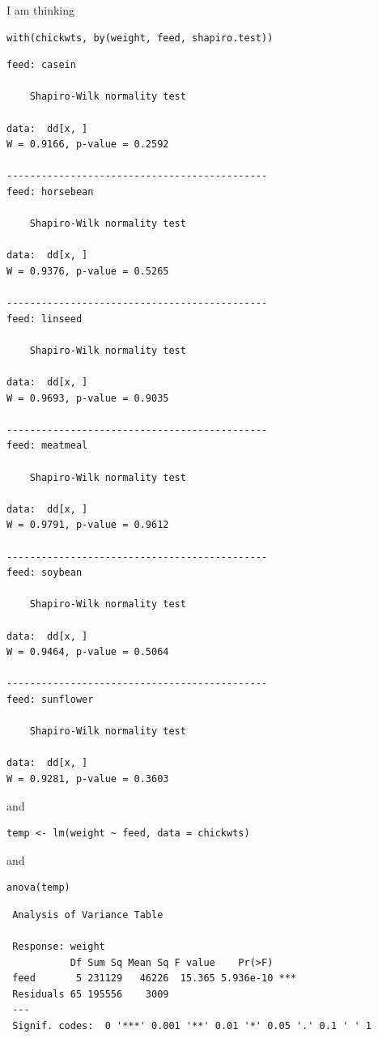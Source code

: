 \documentclass[captions=tableheading]{scrbook}
\begin{document}
I am thinking 

\begin{verbatim}
with(chickwts, by(weight, feed, shapiro.test))
\end{verbatim}


\begin{verbatim}
feed: casein

	Shapiro-Wilk normality test

data:  dd[x, ] 
W = 0.9166, p-value = 0.2592

--------------------------------------------- 
feed: horsebean

	Shapiro-Wilk normality test

data:  dd[x, ] 
W = 0.9376, p-value = 0.5265

--------------------------------------------- 
feed: linseed

	Shapiro-Wilk normality test

data:  dd[x, ] 
W = 0.9693, p-value = 0.9035

--------------------------------------------- 
feed: meatmeal

	Shapiro-Wilk normality test

data:  dd[x, ] 
W = 0.9791, p-value = 0.9612

--------------------------------------------- 
feed: soybean

	Shapiro-Wilk normality test

data:  dd[x, ] 
W = 0.9464, p-value = 0.5064

--------------------------------------------- 
feed: sunflower

	Shapiro-Wilk normality test

data:  dd[x, ] 
W = 0.9281, p-value = 0.3603
\end{verbatim}

and

\begin{verbatim}
temp <- lm(weight ~ feed, data = chickwts)
\end{verbatim}
and 

\begin{verbatim}
anova(temp)
\end{verbatim}

\begin{verbatim}
 Analysis of Variance Table
 
 Response: weight
           Df Sum Sq Mean Sq F value    Pr(>F)    
 feed       5 231129   46226  15.365 5.936e-10 ***
 Residuals 65 195556    3009                      
 ---
 Signif. codes:  0 '***' 0.001 '**' 0.01 '*' 0.05 '.' 0.1 ' ' 1
\end{verbatim}
\end{document}
